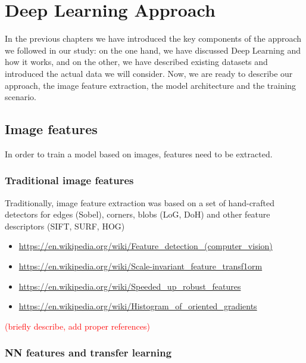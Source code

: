 
\chapter{Deep Learning Approach}

\label{Chapter4}


In the previous chapters we have introduced the key components of the approach we followed in our study: on the one hand, we have discussed Deep Learning and how it works, and on the other, we have described existing datasets and introduced the actual data we will consider. Now, we are ready to describe our approach, the image feature extraction, the model architecture and the training scenario.

\section{Image features}

In order to train a model based on images, features need to be extracted.

\subsection{Traditional image features}

Traditionally, image feature extraction was based on a set of hand-crafted detectors for edges (Sobel), corners, blobs (LoG, DoH) and other feature descriptors (SIFT, SURF, HOG)

\begin{itemize}
	\item \url{https://en.wikipedia.org/wiki/Feature_detection_(computer_vision)}
	\item \url{https://en.wikipedia.org/wiki/Scale-invariant_feature_transf1orm}
	\item \url{https://en.wikipedia.org/wiki/Speeded_up_robust_features}
	\item \url{https://en.wikipedia.org/wiki/Histogram_of_oriented_gradients}
\end{itemize}

\textcolor{red}{(briefly describe, add proper references)}

\subsection{NN features and transfer learning}

